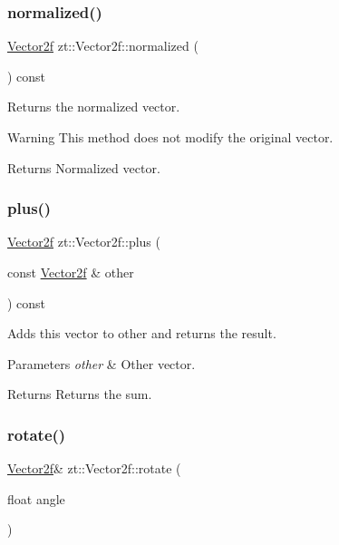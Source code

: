 \subsubsection{\texorpdfstring{normalized()}{normalized()}}
{\footnotesize\ttfamily \hyperlink{classzt_1_1_vector2f}{Vector2f} zt\+::\+Vector2f\+::normalized (\begin{DoxyParamCaption}{ }\end{DoxyParamCaption}) const}



Returns the normalized vector. 

\begin{DoxyWarning}{Warning}
This method does not modify the original vector. 
\end{DoxyWarning}
\begin{DoxyReturn}{Returns}
Normalized vector. 
\end{DoxyReturn}
\mbox{\label{classzt_1_1_vector2f_a9455159e20935fee1c3fd46d5c138caa}} 
\subsubsection{\texorpdfstring{plus()}{plus()}}
{\footnotesize\ttfamily \hyperlink{classzt_1_1_vector2f}{Vector2f} zt\+::\+Vector2f\+::plus (\begin{DoxyParamCaption}\item[{const \hyperlink{classzt_1_1_vector2f}{Vector2f} \&}]{other }\end{DoxyParamCaption}) const}



Adds this vector to other and returns the result. 


\begin{DoxyParams}{Parameters}
{\em other} & Other vector. \\
\hline
\end{DoxyParams}
\begin{DoxyReturn}{Returns}
Returns the sum. 
\end{DoxyReturn}
\mbox{\label{classzt_1_1_vector2f_a97aab9087dc306b6a8b9c61fa84e98de}} 
\subsubsection{\texorpdfstring{rotate()}{rotate()}}
{\footnotesize\ttfamily \hyperlink{classzt_1_1_vector2f}{Vector2f}\& zt\+::\+Vector2f\+::rotate (\begin{DoxyParamCaption}\item[{float}]{angle }\end{DoxyParamCaption})}




